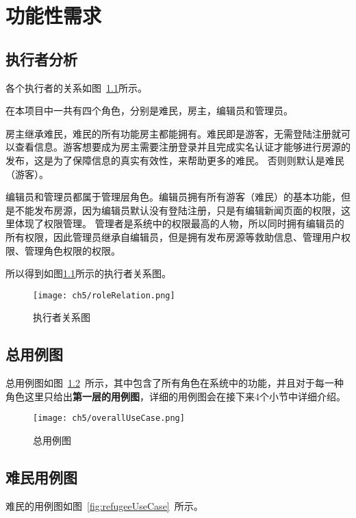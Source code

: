 \chapter{功能性需求}
\section{执行者分析}
各个执行者的关系如图~\ref{fig:roleRelation}所示。

在本项目中一共有四个角色，分别是难民，房主，编辑员和管理员。

房主继承难民，难民的所有功能房主都能拥有。难民即是游客，无需登陆注册就可以查看信息。游客想要成为房主需要注册登录并且完成实名认证才能够进行房源的发布，这是为了保障信息的真实有效性，来帮助更多的难民。
否则则默认是难民（游客）。

编辑员和管理员都属于管理层角色。编辑员拥有所有游客（难民）的基本功能，但是不能发布房源，因为编辑员默认没有登陆注册，只是有编辑新闻页面的权限，这里体现了权限管理。
管理者是系统中的权限最高的人物，所以同时拥有编辑员的所有权限，因此管理员继承自编辑员，但是拥有发布房源等救助信息、管理用户权限、管理角色权限的权限。

所以得到如图\ref{fig:roleRelation}所示的执行者关系图。
\begin{figure}[htbp]
    \centering
    \texttt{[image: ch5/roleRelation.png]}
    \caption{执行者关系图}\label{fig:roleRelation}
    \vspace{\baselineskip} %
\end{figure}

\section{总用例图}
总用例图如图~\ref{fig:overallUseCase}~所示，其中包含了所有角色在系统中的功能，并且对于每一种角色这里只给出\textbf{第一层的用例图}，详细的用例图会在接下来4个小节中详细介绍。

\begin{figure}[htbp]
    \centering
    \texttt{[image: ch5/overallUseCase.png]}
    \caption{总用例图}\label{fig:overallUseCase}
    \vspace{\baselineskip} %
\end{figure}

\section{难民用例图}

难民的用例图如图~\ref{fig:refugeeUseCase}~所示。

